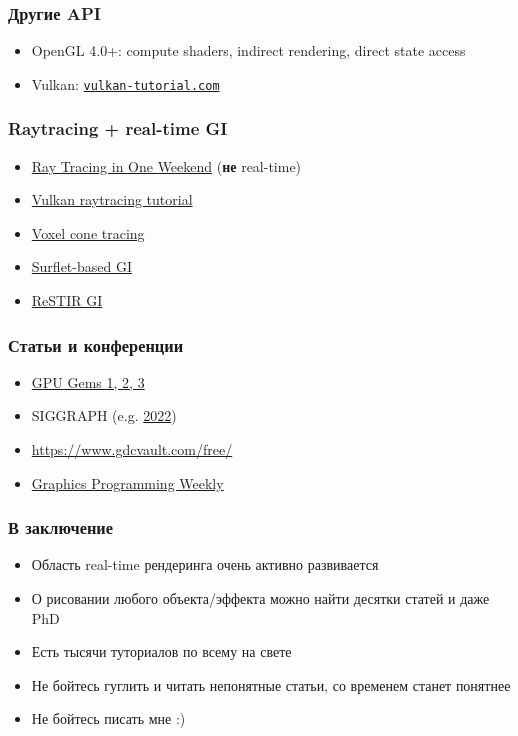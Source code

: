 \documentclass{beamer}
\begin{document}
\begin{frame}[fragile]
\frametitle{Другие API}
\begin{itemize}
\item OpenGL 4.0+: compute shaders, indirect rendering, direct state access
\item Vulkan: \href{https://vulkan-tutorial.com}{\nolinkurl{vulkan-tutorial.com}}
\end{itemize}
\end{frame}

\begin{frame}[fragile]
\frametitle{Raytracing + real-time GI}
\begin{itemize}
\item \href{https://raytracing.github.io/books/RayTracingInOneWeekend.html}{Ray Tracing in One Weekend} (\textbf{не} real-time)
\item \href{https://developer.nvidia.com/rtx/raytracing/vkray}{Vulkan raytracing tutorial}
\item \href{https://research.nvidia.com/sites/default/files/publications/GIVoxels-pg2011-authors.pdf}{Voxel cone tracing}
\item \href{https://www.ea.com/seed/news/siggraph21-global-illumination-surfels}{Surflet-based GI}
\item \href{https://research.nvidia.com/publication/2021-06_restir-gi-path-resampling-real-time-path-tracing}{ReSTIR GI}
\end{itemize}
\end{frame}

\begin{frame}[fragile]
\frametitle{Статьи и конференции}
\begin{itemize}
\item \href{https://developer.nvidia.com/gpugems}{GPU Gems 1, 2, 3}
\item SIGGRAPH (e.g. \href{https://kesen.realtimerendering.com/sig2022.html}{2022})
\item \href{GDC}{https://www.gdcvault.com/free/}
\item \href{https://www.jendrikillner.com/tags/weekly/}{Graphics Programming Weekly}
\end{itemize}
\end{frame}

\begin{frame}[fragile]
\frametitle{В заключение}
\begin{itemize}
\item Область real-time рендеринга очень активно развивается
\item О рисовании любого объекта/эффекта можно найти десятки статей и даже PhD
\item Есть тысячи туториалов по всему на свете
\item Не бойтесь гуглить и читать непонятные статьи, со временем станет понятнее
\item Не бойтесь писать мне :)
\end{itemize}
\end{frame}
\end{document}
